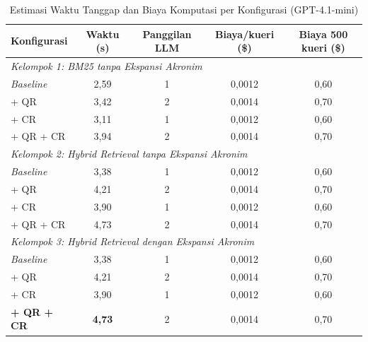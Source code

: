 \begin{table}[H]
\centering
\small
\setlength{\tabcolsep}{5pt}
\caption{Estimasi Waktu Tanggap dan Biaya Komputasi per Konfigurasi (GPT-4.1-mini)}
\label{tbl:waktu-biaya}
\begin{tabular}{lcccc}
\toprule
\textbf{Konfigurasi} & \textbf{Waktu (s)} & \textbf{Panggilan LLM} & \textbf{Biaya/kueri (\$)} & \textbf{Biaya 500 kueri (\$)} \\
\midrule
\multicolumn{5}{l}{\textit{Kelompok 1: BM25 tanpa Ekspansi Akronim}} \\
\quad \textit{Baseline}  & 2{,}59 & 1 & 0{,}0012 & 0{,}60 \\
\quad + QR               & 3{,}42 & 2 & 0{,}0014 & 0{,}70 \\
\quad + CR               & 3{,}11 & 1 & 0{,}0012 & 0{,}60 \\
\quad + QR + CR          & 3{,}94 & 2 & 0{,}0014 & 0{,}70 \\
\midrule
\multicolumn{5}{l}{\textit{Kelompok 2: Hybrid Retrieval tanpa Ekspansi Akronim}} \\
\quad \textit{Baseline}  & 3{,}38 & 1 & 0{,}0012 & 0{,}60 \\
\quad + QR               & 4{,}21 & 2 & 0{,}0014 & 0{,}70 \\
\quad + CR               & 3{,}90 & 1 & 0{,}0012 & 0{,}60 \\
\quad + QR + CR          & 4{,}73 & 2 & 0{,}0014 & 0{,}70 \\
\midrule
\multicolumn{5}{l}{\textit{Kelompok 3: Hybrid Retrieval dengan Ekspansi Akronim}} \\
\quad \textit{Baseline}  & 3{,}38 & 1 & 0{,}0012 & 0{,}60 \\
\quad + QR               & 4{,}21 & 2 & 0{,}0014 & 0{,}70 \\
\quad + CR               & 3{,}90 & 1 & 0{,}0012 & 0{,}60 \\
\quad \textbf{+ QR + CR} & \textbf{4{,}73} & 2 & 0{,}0014 & 0{,}70 \\
\bottomrule
\end{tabular}
\end{table}

